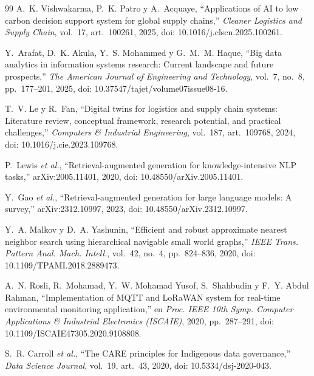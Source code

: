 \documentclass[conference]{IEEEtran}
\begin{document}
\begin{thebibliography}{99}
A.~K. Vishwakarma, P.~K. Patro y A.~Acquaye, ``Applications of AI to low carbon decision support system for global supply chains,'' \emph{Cleaner Logistics and Supply Chain}, vol.~17, art.~100261, 2025, doi: 10.1016/j.clscn.2025.100261.

Y.~Arafat, D.~K. Akula, Y.~S. Mohammed y G.~M.~M. Haque, ``Big data analytics in information systems research: Current landscape and future prospects,'' \emph{The American Journal of Engineering and Technology}, vol.~7, no.~8, pp.~177--201, 2025, doi: 10.37547/tajet/volume07issue08-16.

T.~V. Le y R.~Fan, ``Digital twins for logistics and supply chain systems: Literature review, conceptual framework, research potential, and practical challenges,'' \emph{Computers \& Industrial Engineering}, vol.~187, art.~109768, 2024, doi: 10.1016/j.cie.2023.109768.

P.~Lewis \emph{et al.}, ``Retrieval-augmented generation for knowledge-intensive NLP tasks,'' arXiv:2005.11401, 2020, doi: 10.48550/arXiv.2005.11401.

Y.~Gao \emph{et al.}, ``Retrieval-augmented generation for large language models: A survey,'' arXiv:2312.10997, 2023, doi: 10.48550/arXiv.2312.10997.

Y.~A. Malkov y D.~A. Yashunin, ``Efficient and robust approximate nearest neighbor search using hierarchical navigable small world graphs,'' \emph{IEEE Trans. Pattern Anal. Mach. Intell.}, vol.~42, no.~4, pp.~824--836, 2020, doi: 10.1109/TPAMI.2018.2889473.

A.~N. Rosli, R.~Mohamad, Y.~W. Mohamad Yusof, S.~Shahbudin y F.~Y. Abdul Rahman, ``Implementation of MQTT and LoRaWAN system for real-time environmental monitoring application,'' en \emph{Proc. IEEE 10th Symp. Computer Applications \& Industrial Electronics (ISCAIE)}, 2020, pp.~287--291, doi: 10.1109/ISCAIE47305.2020.9108808.

S.~R. Carroll \emph{et al.}, ``The CARE principles for Indigenous data governance,'' \emph{Data Science Journal}, vol.~19, art.~43, 2020, doi: 10.5334/dsj-2020-043.

\end{thebibliography}
\end{document}
